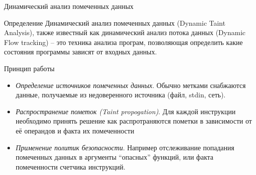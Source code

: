 \documentclass[10pt]{beamer}
\begin{document}
\begin{frame}{Динамический анализ помеченных данных}
  \begin{block}{Определение}
    Динамический анализ помеченных данных (Dynamic Taint Analysis), также известный как динамический анализ потока данных (Dynamic Flow tracking) -- это техника анализа програм, позволяющая определить какие состояния программы зависят от входных данных.
  \end{block}
  \begin{block}{Принцип работы}
    \begin{itemize}
        \item {\em Определение источников помеченных данных}. Обычно метками снабжаются данные, получаемые из недоверенного источника (файл, stdin, сеть).
        \item {\em Распространение пометок (Taint propogation)}. Для каждой инструкции необходимо принять решение как распротраняются пометки в зависимости от её операндов и факта их помеченности
        \item {\em Применение политик безопасности}. Например отслеживание попадания помеченных данных в аргументы ``опасных'' функций, или факта помеченности счетчика инструкций.
    \end{itemize}
  \end{block}
\end{frame}
\end{document}
